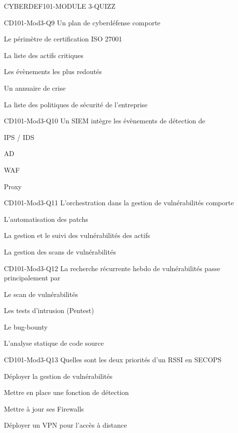 \documentclass[12pt]{article}
\begin{document}
\begin{quiz}{CYBERDEF101-MODULE 3-QUIZZ}
\begin{multi}[multiple=true]{CD101-Mod3-Q9}
Un plan de cyberdéfense comporte
\item Le périmètre de certification ISO 27001
\item* La liste des actifs critiques
\item* Les évènements les plus redoutés
\item* Un annuaire de crise
\item La liste des politiques de sécurité de l’entreprise 
\end{multi}


\begin{multi}[multiple=true]{CD101-Mod3-Q10}
Un SIEM intègre les évènements de détection de
\item* IPS / IDS
\item AD
\item* WAF
\item* Proxy
\end{multi}

\begin{multi}[multiple=true]{CD101-Mod3-Q11}
L’orchestration dans la gestion de vulnérabilités comporte
\item L’automatisation des patchs 
\item* La gestion et le suivi des vulnérabilités des actifs
\item* La gestion des scans de vulnérabilités
\end{multi}

\begin{multi}[multiple=true]{CD101-Mod3-Q12}
La recherche récurrente hebdo de vulnérabilités passe principalement par
\item* Le scan de vulnérabilités
\item Les tests d’intrusion (Pentest)
\item Le bug-bounty
\item* L’analyse statique de code source
\end{multi}

\begin{multi}[multiple=true]{CD101-Mod3-Q13}
 Quelles sont les deux priorités d’un RSSI en SECOPS
\item* Déployer la gestion de vulnérabilités
\item* Mettre en place une fonction de détection
\item Mettre à jour ses Firewalls
\item Déployer un VPN pour l’accès à distance
\end{multi}


\end{quiz}
\end{document}
